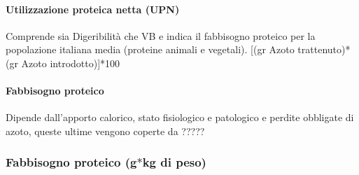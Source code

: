\documentclass[10pt]{article}
\begin{document}
\paragraph*{Utilizzazione proteica netta (UPN)}Comprende sia Digeribilità che VB e indica il fabbisogno proteico per la popolazione italiana media (proteine animali e vegetali). [(gr Azoto trattenuto)*(gr Azoto introdotto)]*100
\paragraph*{Fabbisogno proteico}Dipende dall'apporto calorico, stato fisiologico e patologico e perdite obbligate di azoto, queste ultime vengono coperte da ?????
\subsubsection{Fabbisogno proteico (g$*$kg di peso)}
\end{document}
